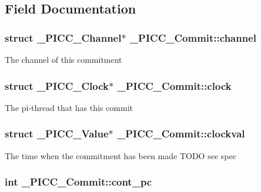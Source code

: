 \subsection{Field Documentation}
\hypertarget{struct__PICC__Commit_af80b43fa7c7a1fee8446a6b2efdaab03}{
\subsubsection[{channel}]{\setlength{\rightskip}{0pt plus 5cm}struct {\bf \-\_\-\-P\-I\-C\-C\-\_\-\-Channel}$\ast$ \-\_\-\-P\-I\-C\-C\-\_\-\-Commit\-::channel}}\label{struct__PICC__Commit_af80b43fa7c7a1fee8446a6b2efdaab03}
The channel of this commitment \hypertarget{struct__PICC__Commit_acf28d34611ca5566a2681238e0d105ea}{
\subsubsection[{clock}]{\setlength{\rightskip}{0pt plus 5cm}struct {\bf \-\_\-\-P\-I\-C\-C\-\_\-\-Clock}$\ast$ \-\_\-\-P\-I\-C\-C\-\_\-\-Commit\-::clock}}\label{struct__PICC__Commit_acf28d34611ca5566a2681238e0d105ea}
The pi-\/thread that has this commit \hypertarget{struct__PICC__Commit_ad26ca86d6ec9cf47f14ce4eac9d2dfaf}{
\subsubsection[{clockval}]{\setlength{\rightskip}{0pt plus 5cm}struct {\bf \-\_\-\-P\-I\-C\-C\-\_\-\-Value}$\ast$ \-\_\-\-P\-I\-C\-C\-\_\-\-Commit\-::clockval}}\label{struct__PICC__Commit_ad26ca86d6ec9cf47f14ce4eac9d2dfaf}
The time when the commitment has been made T\-O\-D\-O see spec \hypertarget{struct__PICC__Commit_a880e72c43ee08a0eaad3ebc3234bc612}{
\subsubsection[{cont\-\_\-pc}]{\setlength{\rightskip}{0pt plus 5cm}int \-\_\-\-P\-I\-C\-C\-\_\-\-Commit\-::cont\-\_\-pc}}\label{struct__PICC__Commit_a880e72c43ee08a0eaad3ebc3234bc612}
